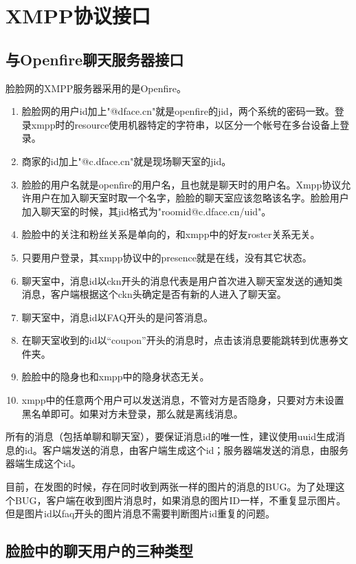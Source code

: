 \section{XMPP协议接口}


\subsection{与Openfire聊天服务器接口}
脸脸网的XMPP服务器采用的是Openfire。

\begin{enumerate}
\item 脸脸网的用户id加上"@dface.cn"就是openfire的jid，两个系统的密码一致。登录xmpp时的resource使用机器特定的字符串，以区分一个帐号在多台设备上登录。
\item 商家的id加上"@c.dface.cn"就是现场聊天室的jid。
\item 脸脸的用户名就是openfire的用户名，且也就是聊天时的用户名。Xmpp协议允许用户在加入聊天室时取一个名字，脸脸的聊天室应该忽略该名字。脸脸用户加入聊天室的时候，其jid格式为"roomid@c.dface.cn/uid"。
\item 脸脸中的关注和粉丝关系是单向的，和xmpp中的好友roster关系无关。
\item 只要用户登录，其xmpp协议中的presence就是在线，没有其它状态。
\item 聊天室中，消息id以ckn开头的消息代表是用户首次进入聊天室发送的通知类消息，客户端根据这个ckn头确定是否有新的人进入了聊天室。
\item 聊天室中，消息id以FAQ开头的是问答消息。
\item 在聊天室收到的id以“coupon”开头的消息时，点击该消息要能跳转到优惠券文件夹。
\item 脸脸中的隐身也和xmpp中的隐身状态无关。
\item xmpp中的任意两个用户可以发送消息，不管对方是否隐身，只要对方未设置黑名单即可。如果对方未登录，那么就是离线消息。
\end{enumerate}

所有的消息（包括单聊和聊天室），要保证消息id的唯一性，建议使用uuid生成消息的id。客户端发送的消息，由客户端生成这个id；服务器端发送的消息，由服务器端生成这个id。

目前，在发图的时候，存在同时收到两张一样的图片的消息的BUG。为了处理这个BUG，客户端在收到图片消息时，如果消息的图片ID一样，不重复显示图片。但是图片id以faq开头的图片消息不需要判断图片id重复的问题。



\subsection{脸脸中的聊天用户的三种类型}

